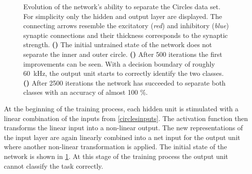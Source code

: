 \begin{figure}[t!]
	\begin{subfigure}{\textwidth}
		\caption{}
		\vspace{-0.1in}
		\centering
		
		\label{learning_process_s5}
		\vspace{-.5in}
	\end{subfigure}
	\begin{subfigure}{\textwidth}
		\caption{}
		\vspace{-0.1in}
		\centering
		
		\label{learning_process_s500}
		\vspace{-.5in}
	\end{subfigure}
	\begin{subfigure}{\textwidth}
		\caption{}
		\vspace{-0.1in}
		\centering
		
		\label{learning_process_s2500}
	\end{subfigure}
	\vspace{-.4in}
	\caption[Evolution of the network's ability to separate the Circles data set.]{Evolution of the network's ability to separate the Circles data set. For simplicity only the hidden and output layer are displayed. The connecting arrows resemble the excitatory (\emph{red}) and inhibitory (\emph{blue}) synaptic connections and their thickness corresponds to the synaptic strength. \textbf{()} The initial untrained state of the network does not separate the inner and outer circle. \textbf{()} After 500 iterations the first improvements can be seen. With a decision boundary of roughly \SI{60}{\kilo \Hz}, the output unit starts to correctly identify the two classes. \textbf{()} After 2500 iterations the network has succeeded to separate both classes with an accuracy of almost 100 \%.}
\end{figure}

At the beginning of the training process, each hidden unit is stimulated with a linear combination of the inputs from \cref{circlesinputs}. The activation function then transforms the linear input into a non-linear output. The new representations of the input layer are again linearly combined into a net input for the output unit where another non-linear transformation is applied. The initial state of the network is shown in \cref{learning_process_s5}. At this stage of the training process the output unit cannot classify the task correctly.

